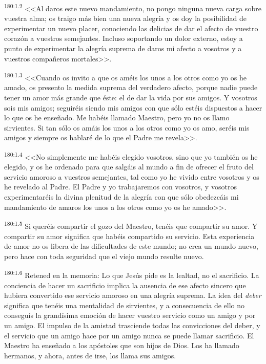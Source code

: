 \par 
\textsuperscript{180:1.2} <<Al daros este nuevo mandamiento, no pongo ninguna nueva carga sobre vuestra alma; os traigo más bien una nueva alegría y os doy la posibilidad de experimentar un nuevo placer, conociendo las delicias de dar el afecto de vuestro corazón a vuestros semejantes. Incluso soportando un dolor externo, estoy a punto de experimentar la alegría suprema de daros mi afecto a vosotros y a vuestros compañeros mortales>>.

\par 
\textsuperscript{180:1.3} <<Cuando os invito a que os améis los unos a los otros como yo os he amado, os presento la medida suprema del verdadero afecto, porque nadie puede tener un amor más grande que éste: el de dar la vida por sus amigos. Y vosotros sois mis amigos; seguiréis siendo mis amigos con que sólo estéis dispuestos a hacer lo que os he enseñado. Me habéis llamado Maestro, pero yo no os llamo sirvientes. Si tan sólo os amáis los unos a los otros como yo os amo, seréis mis amigos y siempre os hablaré de lo que el Padre me revela>>.

\par 
\textsuperscript{180:1.4} <<No simplemente me habéis elegido vosotros, sino que yo también os he elegido, y os he ordenado para que salgáis al mundo a fin de ofrecer el fruto del servicio amoroso a vuestros semejantes, tal como yo he vivido entre vosotros y os he revelado al Padre. El Padre y yo trabajaremos con vosotros, y vosotros experimentaréis la divina plenitud de la alegría con que sólo obedezcáis mi mandamiento de amaros los unos a los otros como yo os he amado>>.

\par 
\textsuperscript{180:1.5} Si queréis compartir el gozo del Maestro, tenéis que compartir su amor. Y compartir su amor significa que habéis compartido su servicio. Esta experiencia de amor no os libera de las dificultades de este mundo; no crea un mundo nuevo, pero hace con toda seguridad que el viejo mundo resulte nuevo.

\par 
\textsuperscript{180:1.6} Retened en la memoria: Lo que Jesús pide es la lealtad, no el sacrificio. La conciencia de hacer un sacrificio implica la ausencia de ese afecto sincero que hubiera convertido ese servicio amoroso en una alegría suprema. La idea del \textit{deber} significa que tenéis una mentalidad de sirvientes, y a consecuencia de ello no conseguís la grandísima emoción de hacer vuestro servicio como un amigo y por un amigo. El impulso de la amistad trasciende todas las convicciones del deber, y el servicio que un amigo hace por un amigo nunca se puede llamar sacrificio. El Maestro ha enseñado a los apóstoles que son hijos de Dios. Los ha llamado hermanos, y ahora, antes de irse, los llama sus amigos.

